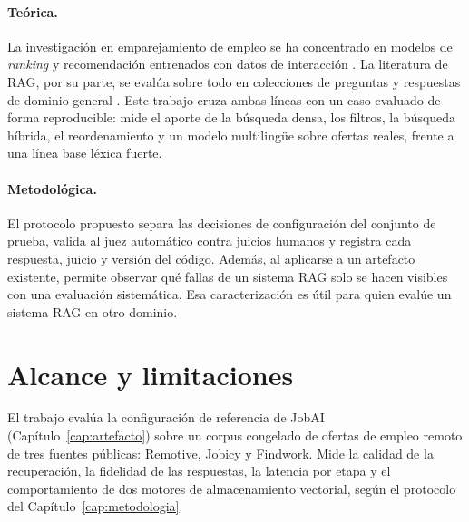 \paragraph{Teórica.} La investigación en emparejamiento de empleo se ha concentrado en modelos de \textit{ranking} y recomendación entrenados con datos de interacción \citep{HaThuc2017,Shen2024,Bocharova2023}. La literatura de RAG, por su parte, se evalúa sobre todo en colecciones de preguntas y respuestas de dominio general \citep{Gao2023}. Este trabajo cruza ambas líneas con un caso evaluado de forma reproducible: mide el aporte de la búsqueda densa, los filtros, la búsqueda híbrida, el reordenamiento y un modelo multilingüe sobre ofertas reales, frente a una línea base léxica fuerte.

\paragraph{Metodológica.} El protocolo propuesto separa las decisiones de configuración del conjunto de prueba, valida al juez automático contra juicios humanos y registra cada respuesta, juicio y versión del código. Además, al aplicarse a un artefacto existente, permite observar qué fallas de un sistema RAG solo se hacen visibles con una evaluación sistemática. Esa caracterización es útil para quien evalúe un sistema RAG en otro dominio.

\section{Alcance y limitaciones}
\label{sec:alcance}

El trabajo evalúa la configuración de referencia de JobAI (Capítulo~\ref{cap:artefacto}) sobre un corpus congelado de ofertas de empleo remoto de tres fuentes públicas: Remotive, Jobicy y Findwork. Mide la calidad de la recuperación, la fidelidad de las respuestas, la latencia por etapa y el comportamiento de dos motores de almacenamiento vectorial, según el protocolo del Capítulo~\ref{cap:metodologia}.

